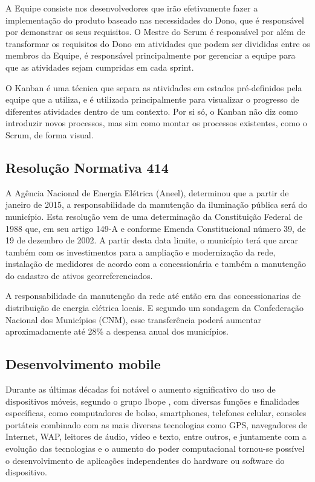 \documentclass[
	article,			%
	11pt,				%
	oneside,			%
	a4paper,			%
	english,			%
	brazil,				%
	sumario=tradicional
	]{abntex2}
\begin{document}
A Equipe consiste nos desenvolvedores que irão efetivamente fazer a
implementação do produto baseado nas necessidades do Dono, que é responsável por
demonstrar os seus requisitos. O Mestre do Scrum é responsável por além de
transformar os requisitos do Dono em atividades que podem ser divididas entre os
membros da Equipe, é responsável principalmente por gerenciar a equipe para que
as atividades sejam cumpridas em cada sprint. \cite{scrum}

O Kanban é uma técnica que separa as atividades em estados pré-definidos pela
equipe que a utiliza, e é utilizada principalmente para visualizar o progresso
de diferentes atividades dentro de um contexto. Por si só, o Kanban não diz como
introduzir novos processos, mas sim como montar os processos existentes, como o
Scrum, de forma visual.

\subsection{Resolução Normativa 414}

A Agência Nacional de Energia Elétrica (Aneel), determinou que a partir de janeiro
de 2015, a responsabilidade da manutenção da iluminação pública será do município.
Esta resolução vem de uma determinação da Constituição Federal de 1988 que,
em seu artigo 149-A e conforme Emenda Constitucional número 39, de 19 de dezembro
de 2002. A partir desta data limite, o município terá que arcar também com os
investimentos para a ampliação e modernização da rede, instalação de medidores
de acordo com a concessionária e também a manutenção do cadastro de ativos
georreferenciados.

A responsabilidade da manutenção da rede até então era das concessionarias de
distribuição de energia elétrica locais. E segundo um sondagem da Confederação
Nacional dos Municípios (CNM), esse transferência poderá aumentar aproximadamente
até 28\% a despensa anual dos municípios.\cite{cdu}

\subsection{Desenvolvimento mobile}

Durante as últimas décadas foi notável o aumento significativo do uso de
dispositivos móveis, segundo o grupo Ibope \cite{ibope}, com diversas funções e finalidades
específicas, como computadores de bolso, smartphones, telefones celular,
consoles portáteis combinado com as mais diversas tecnologias como GPS,
navegadores de Internet, WAP, leitores de áudio, vídeo e texto, entre outros,
e juntamente com a evolução das tecnologias e o aumento do poder computacional
tornou-se possível o desenvolvimento de aplicações independentes do hardware ou
software do dispositivo.
\end{document}
